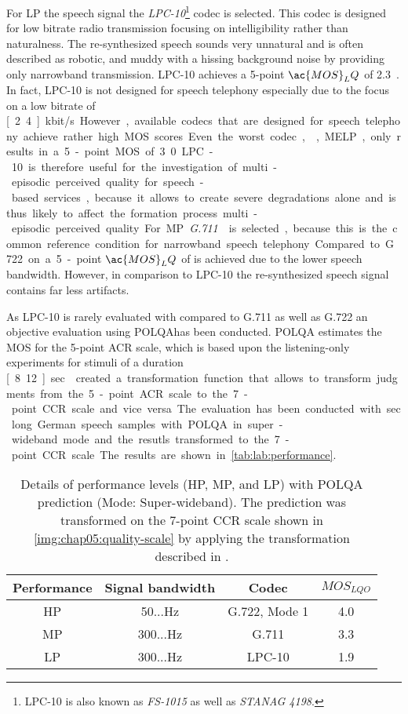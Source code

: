 For \ac{LP} the speech signal the \emph{LPC-10}\footnote{LPC-10 is also known as \emph{FS-1015} as well as \emph{STANAG 4198}.} codec is selected. %
This codec is designed for low bitrate radio transmission focusing on intelligibility rather than naturalness.
The re-synthesized speech sounds very unnatural and is often described as robotic, and muddy with a hissing background noise by providing only narrowband transmission.
LPC-10 achieves a 5-point $\ac{MOS}_LQ$ of 2.3~\cite{gibson book}.
In fact, LPC-10 is not designed for speech telephony especially due to the focus on a low bitrate of \unit[2.4]{kbit/s}.
However, available codecs that are designed for speech telephony achieve rather high \ac{MOS} scores.
Even the worst codec, \ie, \ac{MELP}, only results in a 5-point \ac{MOS} of 3.0. 
LPC-10 is therefore useful for the investigation of multi-episodic perceived quality for speech-based services, because it allows to create severe degradations alone and is thus likely to affect the formation process multi-episodic perceived quality.

For \ac{MP} \emph{G.711}~\cite{itu-t_g.711} is selected, because this is the common reference condition for narrowband speech telephony.
Compared to G.722 on a 5-point $\ac{MOS}_LQ$ of is achieved due to the lower speech bandwidth.
However, in comparison to LPC-10 the re-synthesized speech signal contains far less artifacts.

As LPC-10 is rarely evaluated with compared to G.711 as well as G.722 an objective evaluation using \ac{POLQA}has been conducted.
\ac{POLQA} estimates the \ac{MOS} for the 5-point \ac{ACR} scale, which is based upon the listening-only experiments for stimuli of a duration \unit[8...12]{sec}.
\cite{koster_comparison_2015} created a transformation function that allows to transform judgments from the 5-point \ac{ACR} scale to the 7-point \ac{CCR} scale and vice versa.
The evaluation has been conducted with \unit[12]{sec} long German speech samples with \ac{POLQA} in super-wideband mode and the resutls transformed to the 7-point \ac{CCR} scale.
The results are shown in \autoref{tab:lab:performance}.

\begin{table}[h]
 \centering
 \begin{tabulary}{\columnwidth}{C|C|C|C}
   Performance & Signal bandwidth & Codec & $MOS_{LQO}$ \\
   \midrule
   \ac{HP} & 50...\unit[7000]{Hz}  & G.722, Mode 1 & 4.0 \\ %
   \hline
   \ac{MP} & 300...\unit[3400]{Hz} & G.711         & 3.3 \\ %
   \hline
   \ac{LP} & 300...\unit[3400]{Hz} & LPC-10        & 1.9 \\ %
   \end{tabulary}
   \caption{Details of performance levels (\ac{HP}, \ac{MP}, and \ac{LP}) with \ac{POLQA} prediction (Mode: Super-wideband).
   The prediction was transformed on the 7-point \ac{CCR} scale shown in  \autoref{img:chap05:quality-scale} by applying the transformation described in \cite{koster_comparison_2015}.}
   \label{tab:lab:performance}
\end{table}


